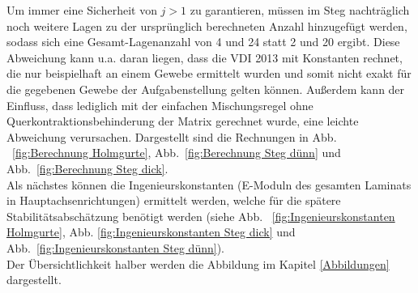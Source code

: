\noindent Um immer eine Sicherheit von $j>1$ zu garantieren, müssen im Steg nachträglich noch weitere Lagen zu der ursprünglich berechneten Anzahl hinzugefügt werden, sodass sich eine Gesamt-Lagenanzahl von 4 und 24 statt 2 und 20 ergibt. Diese Abweichung kann u.a. daran liegen, dass die VDI 2013 mit Konstanten rechnet, die nur beispielhaft an einem Gewebe ermittelt wurden und somit nicht exakt für die gegebenen Gewebe der Aufgabenstellung gelten können. Außerdem kann der Einfluss, dass lediglich mit der einfachen Mischungsregel ohne Querkontraktionsbehinderung der Matrix gerechnet wurde, eine leichte Abweichung verursachen.
Dargestellt sind die Rechnungen in Abb. ~\ref{fig:Berechnung Holmgurte}, Abb.~\ref{fig:Berechnung Steg dünn} und Abb.~\ref{fig:Berechnung Steg dick}.\\

\noindent Als nächstes können die Ingenieurskonstanten (E-Moduln des gesamten Laminats in Hauptachsenrichtungen) ermittelt werden, welche für die spätere Stabilitätsabschätzung benötigt werden (siehe Abb. ~\ref{fig:Ingenieurskonstanten Holmgurte}, Abb. \ref{fig:Ingenieurskonstanten Steg dick} und Abb.~\ref{fig:Ingenieurskonstanten Steg dünn}).\\

\noindent Der Übersichtlichkeit halber werden die Abbildung im Kapitel \ref{Abbildungen} dargestellt.